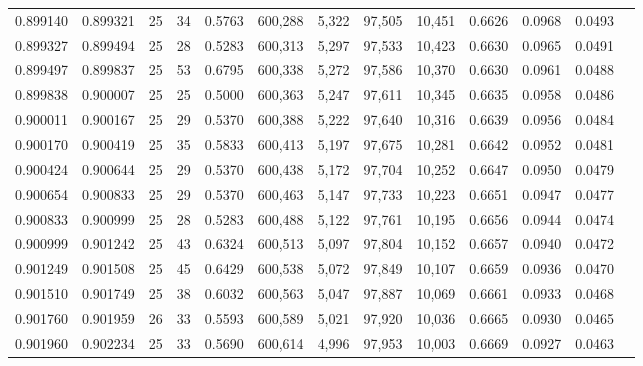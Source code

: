 \begin{tabular}{rrrrrrrrrrrrr}
0.899140 & 0.899321 &    25 &  34 &                                     0.5763 & 600,288 &   5,322 &  97,505 &  10,451 & 0.6626 & 0.0968 & 0.0493 \\
0.899327 & 0.899494 &    25 &  28 &                                     0.5283 & 600,313 &   5,297 &  97,533 &  10,423 & 0.6630 & 0.0965 & 0.0491 \\
0.899497 & 0.899837 &    25 &  53 &                                     0.6795 & 600,338 &   5,272 &  97,586 &  10,370 & 0.6630 & 0.0961 & 0.0488 \\
0.899838 & 0.900007 &    25 &  25 &                                     0.5000 & 600,363 &   5,247 &  97,611 &  10,345 & 0.6635 & 0.0958 & 0.0486 \\
0.900011 & 0.900167 &    25 &  29 &                                     0.5370 & 600,388 &   5,222 &  97,640 &  10,316 & 0.6639 & 0.0956 & 0.0484 \\
0.900170 & 0.900419 &    25 &  35 &                                     0.5833 & 600,413 &   5,197 &  97,675 &  10,281 & 0.6642 & 0.0952 & 0.0481 \\
0.900424 & 0.900644 &    25 &  29 &                                     0.5370 & 600,438 &   5,172 &  97,704 &  10,252 & 0.6647 & 0.0950 & 0.0479 \\
0.900654 & 0.900833 &    25 &  29 &                                     0.5370 & 600,463 &   5,147 &  97,733 &  10,223 & 0.6651 & 0.0947 & 0.0477 \\
0.900833 & 0.900999 &    25 &  28 &                                     0.5283 & 600,488 &   5,122 &  97,761 &  10,195 & 0.6656 & 0.0944 & 0.0474 \\
0.900999 & 0.901242 &    25 &  43 &                                     0.6324 & 600,513 &   5,097 &  97,804 &  10,152 & 0.6657 & 0.0940 & 0.0472 \\
0.901249 & 0.901508 &    25 &  45 &                                     0.6429 & 600,538 &   5,072 &  97,849 &  10,107 & 0.6659 & 0.0936 & 0.0470 \\
0.901510 & 0.901749 &    25 &  38 &                                     0.6032 & 600,563 &   5,047 &  97,887 &  10,069 & 0.6661 & 0.0933 & 0.0468 \\
0.901760 & 0.901959 &    26 &  33 &                                     0.5593 & 600,589 &   5,021 &  97,920 &  10,036 & 0.6665 & 0.0930 & 0.0465 \\
0.901960 & 0.902234 &    25 &  33 &                                     0.5690 & 600,614 &   4,996 &  97,953 &  10,003 & 0.6669 & 0.0927 & 0.0463 \\

\end{tabular}
